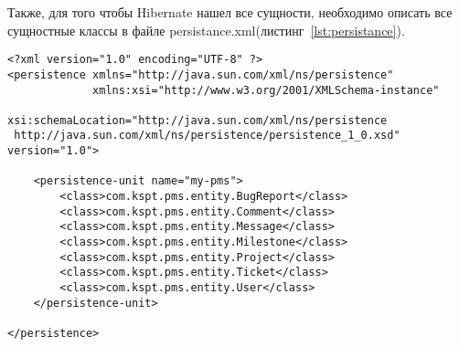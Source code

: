 Также, для того чтобы Hibernate нашел все сущности, необходимо описать все сущностные классы в файле persistance.xml(листинг~\ref{lst:persistance}).
\begin{lstlisting}[style=crs_xml, label={lst:persistance}, caption={Файл persistance.xml}]
<?xml version="1.0" encoding="UTF-8" ?>
<persistence xmlns="http://java.sun.com/xml/ns/persistence"
             xmlns:xsi="http://www.w3.org/2001/XMLSchema-instance"
             xsi:schemaLocation="http://java.sun.com/xml/ns/persistence
 http://java.sun.com/xml/ns/persistence/persistence_1_0.xsd" version="1.0">

    <persistence-unit name="my-pms">
        <class>com.kspt.pms.entity.BugReport</class>
        <class>com.kspt.pms.entity.Comment</class>
        <class>com.kspt.pms.entity.Message</class>
        <class>com.kspt.pms.entity.Milestone</class>
        <class>com.kspt.pms.entity.Project</class>
        <class>com.kspt.pms.entity.Ticket</class>
        <class>com.kspt.pms.entity.User</class>
    </persistence-unit>

</persistence>
\end{lstlisting}

